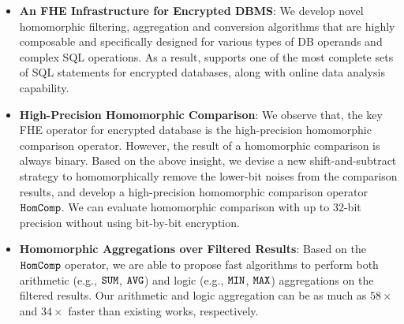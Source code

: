 \noindent
\begin{itemize}
    \item {\bf{An FHE Infrastructure for Encrypted DBMS}}:
    We develop novel homomorphic filtering, aggregation and
    conversion algorithms that are highly composable and specifically designed
    for various types of DB operands and complex SQL operations.
    As a result, \NAME supports one of the most complete sets 
    of SQL statements 
    for encrypted databases, along with online data analysis capability.
    \item {\bf{High-Precision Homomorphic Comparison}}: 
    We observe that, the key FHE operator for encrypted database is
    the high-precision homomorphic comparison operator. 
    However, the result of a homomorphic comparison is always binary.
    Based on the above insight, we devise a new shift-and-subtract strategy
    to homomorphically remove the lower-bit noises from the comparison results,
    and develop a high-precision homomorphic comparison operator $\texttt{HomComp}$.
    We can evaluate homomorphic comparison with up to 32-bit precision without using
    bit-by-bit encryption.
    \item {\bf{Homomorphic Aggregations over Filtered Results}}:
    Based on the $\texttt{HomComp}$ operator, we are able to propose fast algorithms to perform both 
    arithmetic (e.g., $\texttt{SUM}$, $\texttt{AVG}$)  and logic (e.g., $\texttt{MIN}$, $\texttt{MAX}$)
    aggregations on the filtered results. Our arithmetic and logic aggregation
    can be as much as $58\times$ and $34\times$ faster than existing works, respectively.
    

\end{itemize}
